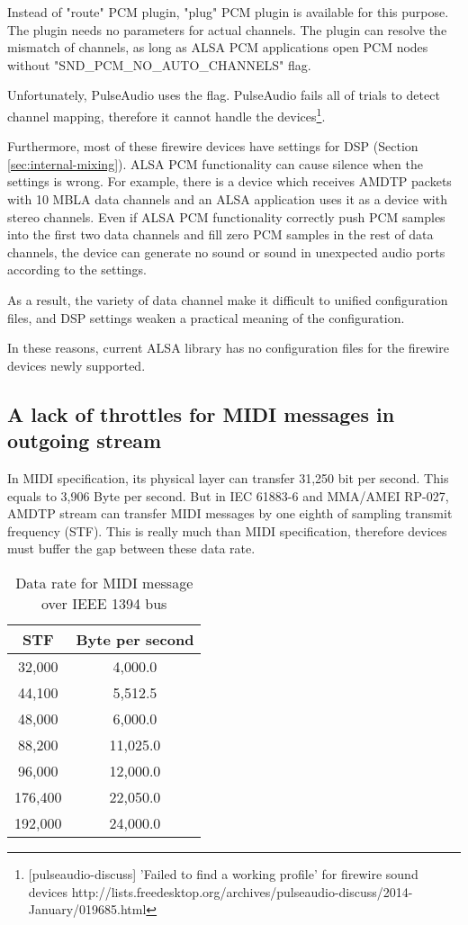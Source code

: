 \documentclass[onecolumn]{article}
\begin{document}
Instead of "route" PCM plugin, "plug" PCM plugin is available for this purpose. The plugin needs no parameters for actual channels. The plugin can resolve the mismatch of channels, as long as ALSA PCM applications open PCM nodes without "SND\_PCM\_NO\_AUTO\_CHANNELS" flag.

Unfortunately, PulseAudio uses the flag. PulseAudio fails all of trials to detect channel mapping, therefore it cannot handle the devices\footnote{[pulseaudio-discuss] 'Failed to find a working profile' for firewire sound devices http://lists.freedesktop.org/archives/pulseaudio-discuss/2014-January/019685.html}.

Furthermore, most of these firewire devices have settings for DSP (Section \ref{sec:internal-mixing}). ALSA PCM functionality can cause silence when the settings is wrong. For example, there is a device which receives AMDTP packets with 10 MBLA data channels and an ALSA application uses it as a device with stereo channels. Even if ALSA PCM functionality correctly push PCM samples into the first two data channels and fill zero PCM samples in the rest of data channels, the device can generate no sound or sound in unexpected audio ports according to the settings.

As a result, the variety of data channel make it difficult to unified configuration files, and DSP settings weaken a practical meaning of the configuration.

In these reasons, current ALSA library has no configuration files for the firewire devices newly supported.

\subsection{A lack of throttles for MIDI messages in outgoing stream}
In MIDI specification, its physical layer can transfer 31,250 bit per second. This equals to 3,906 Byte per second. But in IEC 61883-6\cite{iec61883-6-1, iec61883-6-2} and MMA/AMEI RP-027\cite{amei-rp27}, AMDTP stream can transfer MIDI messages by one eighth of sampling transmit frequency (STF). This is really much than MIDI specification, therefore devices must buffer the gap between these data rate.

\begin{table}[H]
	\centering
	\caption{{Data rate for MIDI message over IEEE 1394 bus}}
	\label{tbl:midi-rate}
	\begin{tabular}{cc} \toprule
		STF	& Byte per second \\ \midrule
		32,000	& 4,000.0	\\
		44,100	& 5,512.5	\\
		48,000	& 6,000.0	\\
		88,200	& 11,025.0	\\
		96,000	& 12,000.0	\\
		176,400	& 22,050.0	\\
		192,000	& 24,000.0	\\ \bottomrule
	\end{tabular}
\end{table}
\end{document}
